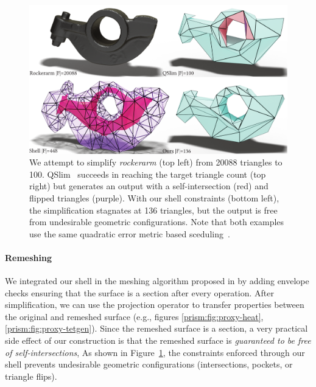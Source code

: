 \begin{figure}
    \centering
    \includegraphics[width=1\linewidth]{prism-tex/figs/rockerarm_qslim}
    \caption{We attempt to simplify \protect\emph{rockerarm} (top left) from 20088 triangles to 100. QSlim~\cite{garland1998simplifying} succeeds in reaching the target triangle count (top right) but generates an output with a self-intersection (red) and flipped triangles (purple).
    With our shell constraints (bottom left), the simplification stagnates at 136 triangles, but the output is free from undesirable geometric configurations. {Note that both examples use the same quadratic error metric based sceduling~\cite{garland1998simplifying}.}
    }
    \label{prism:fig:qslim100}
    
\end{figure}

\paragraph{Remeshing}
We integrated our shell in the meshing algorithm proposed in \cite{dunyach2013adaptive} by adding envelope checks ensuring that the surface is a section after every operation. After simplification, we can use the projection operator to transfer properties between the original and remeshed surface (e.g., figures \ref{prism:fig:proxy-heat}, \ref{prism:fig:proxy-tetgen}).
Since the  remeshed surface is a section, a very practical side effect of our construction is that the remeshed surface is \emph{guaranteed to be free of self-intersections}, 
As shown in Figure~\ref{prism:fig:qslim100}, the constraints enforced through our shell prevents undesirable geometric configurations (intersections, pockets, or triangle flips).

